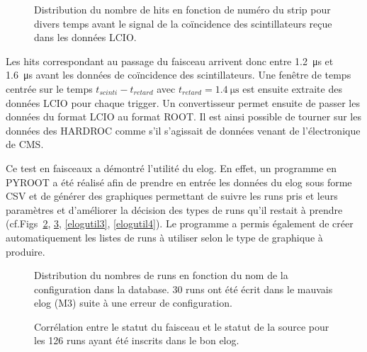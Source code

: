 \begin{figure}[ht!]
	\hfill
	\caption{Distribution du nombre de hits en fonction de numéro du strip pour divers temps avant le signal de la coïncidence des scintillateurs reçue dans les données LCIO.}
	\label{decalage}
\end{figure}  

Les hits correspondant au passage du faisceau arrivent donc entre  \SI{1.2}{\micro\second} et \SI{1.6}{\micro\second} avant les données de coïncidence des scintillateurs. Une fenêtre de temps centrée sur le temps $t_{scinti}-t_{retard}$ avec $t_{retard}=\SI{1.4}{\micro\second}$ est ensuite extraite des données LCIO pour chaque trigger. Un convertisseur permet ensuite de passer les données du format LCIO au format ROOT. Il est ainsi possible de tourner sur les données des HARDROC comme s'il s'agissait de données venant de l'électronique de CMS.

Ce test en faisceaux a démontré l'utilité du elog. En effet, un programme en PYROOT a été réalisé afin de prendre en entrée les données du elog sous forme CSV et de générer des graphiques permettant de suivre les runs pris et leurs paramètres et d'améliorer la décision des types de runs qu'il restait à prendre (cf.Figs~\ref{elogutil1}, \ref{elogutil2}, \ref{elogutil3}, \ref{elogutil4}). Le programme a permis également de créer automatiquement les listes de runs à utiliser selon le type de graphique à produire. 

\begin{figure}[ht!]
	\centering
	\caption{Distribution du nombres de runs en fonction du nom de la configuration dans la database. \num{30} runs ont été écrit dans le mauvais elog (M3) suite à une erreur de configuration.}
	\label{elogutil1}	
\end{figure}

\begin{figure}[ht!]
	\centering
	\caption{Corrélation entre le statut du faisceau et le statut de la source pour les \num{126} runs ayant été inscrits dans le bon elog.}
	\label{elogutil2}	
\end{figure}

